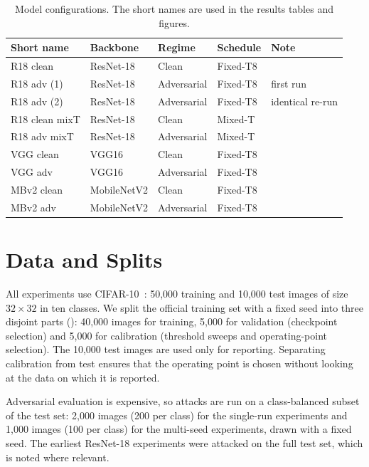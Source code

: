 \begin{table}[htbp]
    \centering
    \caption{Model configurations. The short names are used in the results tables and figures.}
    \label{tab:configs}
    \small
    \begin{tabular}{@{}l l l l l@{}}
        \toprule
        Short name & Backbone & Regime & Schedule & Note \\
        \midrule
        R18 clean        & ResNet-18   & Clean       & Fixed-T8 & \\
        R18 adv (1)      & ResNet-18   & Adversarial & Fixed-T8 & first run \\
        R18 adv (2)      & ResNet-18   & Adversarial & Fixed-T8 & identical re-run \\
        R18 clean mixT   & ResNet-18   & Clean       & Mixed-T  & \\
        R18 adv mixT     & ResNet-18   & Adversarial & Mixed-T  & \\
        VGG clean        & VGG16       & Clean       & Fixed-T8 & \\
        VGG adv          & VGG16       & Adversarial & Fixed-T8 & \\
        MBv2 clean       & MobileNetV2 & Clean       & Fixed-T8 & \\
        MBv2 adv         & MobileNetV2 & Adversarial & Fixed-T8 & \\
        \bottomrule
    \end{tabular}
\end{table}

\section{Data and Splits}
\label{sec:meth-data}

All experiments use CIFAR-10~\cite{krizhevsky2009learning}: 50{,}000 training and 10{,}000 test images of size $32 \times 32$ in ten classes. We split the official training set with a fixed seed into three disjoint parts (): 40{,}000 images for training, 5{,}000 for validation (checkpoint selection) and 5{,}000 for calibration (threshold sweeps and operating-point selection). The 10{,}000 test images are used only for reporting. Separating calibration from test ensures that the operating point is chosen without looking at the data on which it is reported.

Adversarial evaluation is expensive, so attacks are run on a class-balanced subset of the test set: 2{,}000 images (200 per class) for the single-run experiments and 1{,}000 images (100 per class) for the multi-seed experiments, drawn with a fixed seed. The earliest ResNet-18 experiments were attacked on the full test set, which is noted where relevant.

